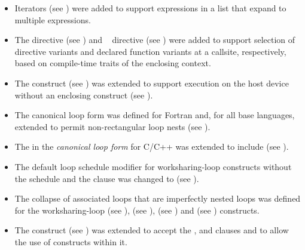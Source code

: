 \begin{itemize}
\item Iterators (see ) were added to support 
      expressions in a list that expand to multiple expressions.

\item The  directive 
      (see ) and 
      ~ directive (see
      ) were added to support selection 
      of  directive variants and declared function variants at  a callsite, 
      respectively, based on compile-time traits of the enclosing context.

\item The  construct (see ) was
      extended to support execution on the host device without an enclosing
       construct (see ).

\item The canonical loop form was defined for Fortran and, for all base
      languages, extended to permit non-rectangular loop nests (see
      ).

\item The  in the \textit{canonical loop form} for C/C++ was
      extended to include \code{!=} (see ).

\item The default loop schedule modifier for worksharing-loop constructs 
      without the  schedule and the  clause 
      was changed to  (see 
      ).

\item The collapse of associated loops that are imperfectly nested loops
      was defined for the worksharing-loop 
      (see ),
       (see ), 
      (see ) and  (see
      ) constructs.

\item The  construct (see ) was 
      extended to accept the ,  and 
       clauses and to allow the use of  
      constructs within it.


\end{itemize}
